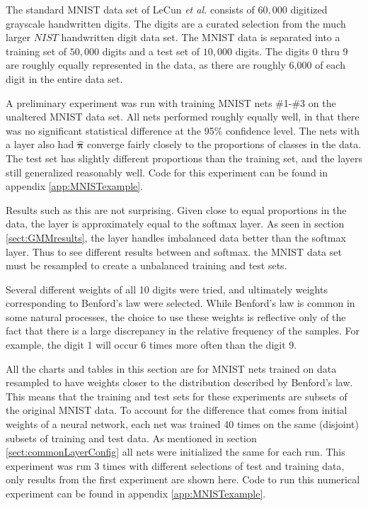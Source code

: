 \label{sect:MNISTresults}
The standard MNIST data set of LeCun \textit{et al.} \cite{lecun1998gradient} consists of \( 60,000 \) digitized grayscale handwritten digits. The digits are a curated selection from the much larger \( NIST \) handwritten digit data set.  The MNIST data is separated into a training set of \( 50,000 \) digits and a test set of \( 10,000 \) digits.  The digits 0 thru 9 are roughly equally represented in the data, as there are roughly 6,000 of each digit in the entire data set.

A preliminary experiment was run with training MNIST nets \#1-\#3 on the unaltered MNIST data set.  All nets performed roughly equally well, in that there was no significant statistical difference at the 95\% confidence level. The nets with a \RS layer also had \( \hat{\bm \pi} \) converge fairly closely to the proportions of classes in the data.  The test set has slightly different proportions than the training set, and the \RS layers still generalized reasonably well. Code for this experiment can be found in appendix \ref{app:MNISTexample}. 

Results such as this are not surprising. Given close to equal proportions in the data, the \RS layer is approximately equal to the softmax layer. As seen in section \ref{sect:GMMresults}, the \RS layer handles imbalanced data better than the softmax layer. Thus to see different results between \RS and softmax. the MNIST data set must be resampled to create a unbalanced training and test sets.

Several different weights of all 10 digits were tried, and ultimately weights corresponding to Benford's law \cite{benford1938} were selected. While Benford's law is common in some natural processes, the choice to use these weights is reflective only of the fact that there is a large discrepancy in the relative frequency of the samples.  For example, the digit 1 will occur 6 times more often than the digit 9.

All the charts and tables in this section are for MNIST nets trained on data resampled to have weights closer to the distribution described by Benford's law.  This means that the training and test sets for these experiments are subsets of the original MNIST data.  To account for the difference that comes from initial weights of a neural network, each net was trained 40 times on the same (disjoint) subsets of training and test data. As mentioned in section \ref{sect:commonLayerConfig} all nets were initialized the same for each run. This experiment was run 3 times with different selections of test and training data, only results from the first experiment are shown here.  Code to run this numerical experiment can be found in appendix \ref{app:MNISTexample}.

